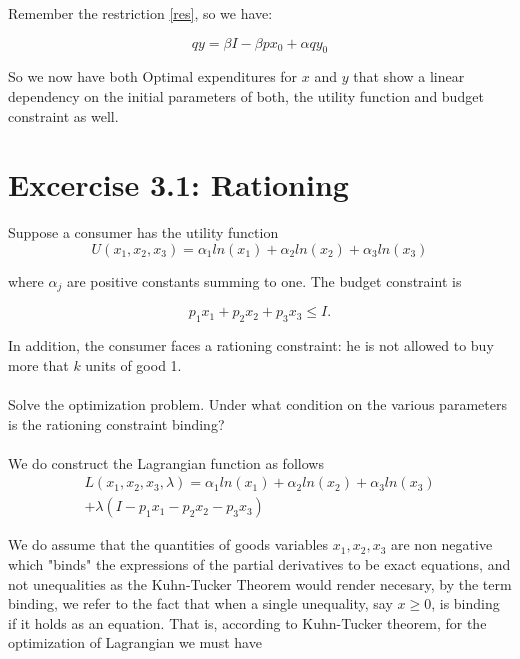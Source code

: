 \documentclass{article}
\begin{document}
\medskip

Remember the restriction \ref{res}, so we have:

\begin{equation}
  qy = \beta I - \beta px_0 + \alpha qy_0
\end{equation}

\medskip

So we now have both Optimal expenditures for $x$ and $y$ that show a linear dependency on the initial parameters of both, the utility function and budget constraint as well.

\bigskip

\section*{Excercise 3.1: Rationing}

\medskip

Suppose a consumer has the utility function
\begin{equation}\label{ut}
  U(x_1, x_2, x_3) = \alpha_1 ln(x_1) + \alpha_2 ln(x_2) +\alpha_3 ln(x_3)
\end{equation}

where $\alpha_j$ are positive constants summing to one. The budget constraint is

\begin{equation}
  p_1x_1 + p_2x_2 + p_3x_3 \leq I.
\end{equation}

In addition, the consumer faces a rationing constraint: he is not allowed to buy more that $k$ units of good 1.

\paragraph{}
Solve the optimization problem. Under what condition on the various parameters is the rationing constraint binding?

\paragraph{}
We do construct the Lagrangian function as follows
\begin{multline}
  L(x_1, x_2, x_3, \lambda) = \alpha_1 ln(x_1) + \alpha_2 ln(x_2) +\alpha_3 ln(x_3) \\ + \lambda (I - p_1x_1 - p_2x_2 - p_3x_3)
\end{multline}

We do assume that the quantities of goods variables $x_1, x_2, x_3$ are non negative which "binds" the expressions of the partial derivatives to be exact equations, and not unequalities as the Kuhn-Tucker Theorem would render necesary, by the term binding, we refer to the fact that when a single unequality, say $x \geq 0$, is binding if it holds as an equation. That is, according to Kuhn-Tucker theorem, for the optimization of Lagrangian we must have
\end{document}
